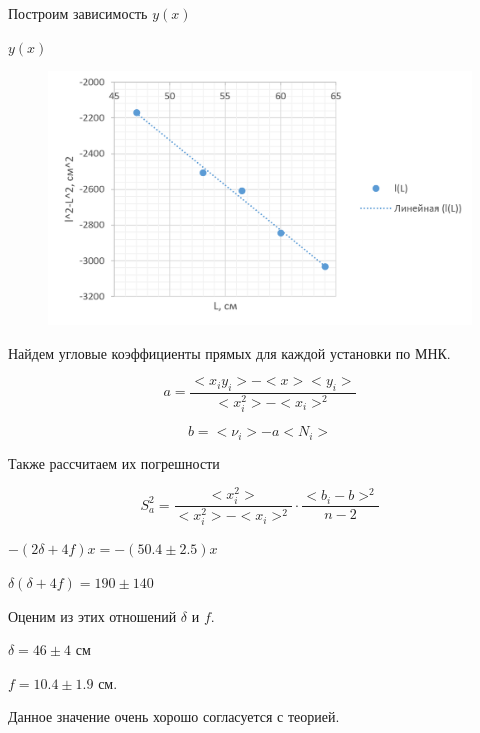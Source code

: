 \documentclass{astroedu-lab}
\begin{document}
\begin{problem}
\newpage

Построим зависимость $y(x)$

\begin{center}
	\Large $y(x)$
\end{center}

\begin{figure}[H]
    \centering
    \includegraphics[scale=0.45]{2024-04-08_01-52-45}
\end{figure}

Найдем угловые коэффициенты прямых для каждой установки по МНК.

\[
	a = \frac{<x_i y_i> - < x > < y_i >}{< x_i^2> - < x_i >^2}
\]

\[
	b = < \nu_i > - a < N_i >
\]

Также рассчитаем их погрешности

\begin{equation}
	S_a^2 = \frac{< x_i^2>}{< x_i^2 > - < x_i >^2} \cdot \frac{<  b_i - b > ^2}{n - 2}
\end{equation}

$-(2 \delta + 4 f) x = -(50.4 \pm 2.5) x$

$\delta (\delta + 4 f) = 190 \pm 140$

Оценим из этих отношений $\delta$ и $f$.

$\delta = 46 \pm 4$ см

$f = 10.4 \pm 1.9$ см.

Данное значение очень хорошо согласуется с теорией.



\end{problem}
\end{document}
